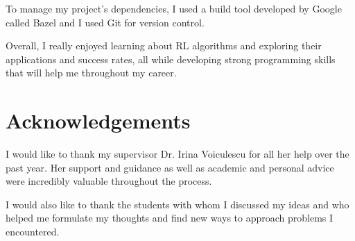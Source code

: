 \documentclass[11pt,a4paper]{report}
\begin{document}
To manage my project’s dependencies, I used a build tool developed by Google called Bazel and I used Git for version control.

Overall, I really enjoyed learning about RL algorithms and exploring their applications and success rates, all while developing strong programming skills that will help me throughout my career.


\chapter{Acknowledgements}

I would like to thank my supervisor Dr. Irina Voiculescu for all her help over the past year. Her support and guidance as well as academic and personal advice were incredibly valuable throughout the process.

I would also like to thank the students with whom I discussed my ideas and who helped me formulate my thoughts and find new ways to approach problems I encountered.


{}

\end{document}
